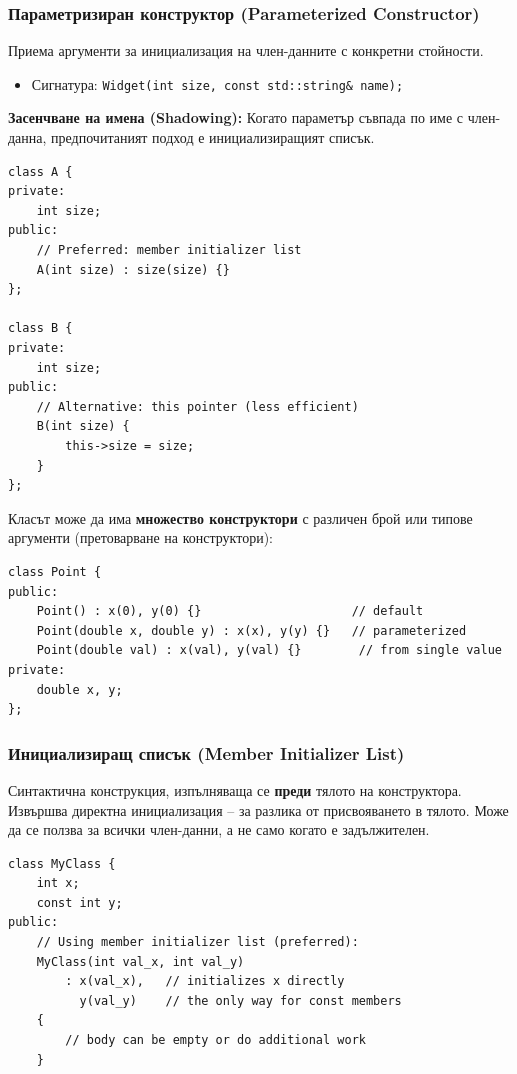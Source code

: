 \documentclass{scrartcl}
\begin{document}
\begin{FlushLeft}
\subsubsection{Параметризиран конструктор (Parameterized Constructor)}
Приема аргументи за инициализация на член-данните с конкретни стойности.
\begin{itemize}
    \item Сигнатура: \texttt{Widget(int size, const std::string\& name);}
\end{itemize}

\textbf{Засенчване на имена (Shadowing):} Когато параметър съвпада по име с член-данна, предпочитаният подход е инициализиращият списък.

\begin{lstlisting}
class A {
private:
    int size;
public:
    // Preferred: member initializer list
    A(int size) : size(size) {}
};

class B {
private:
    int size;
public:
    // Alternative: this pointer (less efficient)
    B(int size) {
        this->size = size;
    }
};
\end{lstlisting}

Класът може да има \textbf{множество конструктори} с различен брой или типове аргументи (претоварване на конструктори):

\begin{lstlisting}
class Point {
public:
    Point() : x(0), y(0) {}                     // default
    Point(double x, double y) : x(x), y(y) {}   // parameterized
    Point(double val) : x(val), y(val) {}        // from single value
private:
    double x, y;
};
\end{lstlisting}

\subsubsection{Инициализиращ списък (Member Initializer List)}
Синтактична конструкция, изпълняваща се \textbf{преди} тялото на конструктора. Извършва директна инициализация -- за разлика от присвояването в тялото. Може да се ползва за всички член-данни, а не само когато е задължителен.

\begin{lstlisting}
class MyClass {
    int x;
    const int y;
public:
    // Using member initializer list (preferred):
    MyClass(int val_x, int val_y)
        : x(val_x),   // initializes x directly
          y(val_y)    // the only way for const members
    {
        // body can be empty or do additional work
    }


\end{lstlisting}
\end{FlushLeft}
\end{document}
